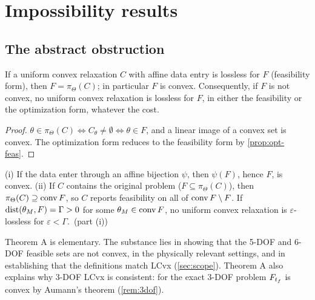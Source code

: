 \section{Impossibility results}\label{sec:impossibility}

\subsection{The abstract obstruction}

\begin{theorem}[Theorem A]\label{thm:A}
If a uniform convex relaxation $C$ with affine data entry is lossless for $F$ (feasibility form), then
$F=\pi_\Theta(C)$; in particular $F$ is convex. Consequently, if $F$ is not convex, no uniform convex relaxation is
lossless for $F$, in either the feasibility or the optimization form, whatever the cost.\Slean
\end{theorem}
\begin{proof}
$\theta\in\pi_\Theta(C)\iff C_\theta\neq\emptyset\iff\theta\in F$, and a linear image of a convex set is convex. The
optimization form reduces to the feasibility form by \cref{prop:opt-feas}.
\end{proof}

\begin{corollary}\label{cor:A}
(i) If the data enter through an affine bijection $\psi$, then $\psi(F)$, hence $F$, is convex.
(ii) If $C$ contains the original problem ($F\subseteq\pi_\Theta(C)$), then $\pi_\Theta(C)\supseteq\operatorname{conv} F$, so $C$
reports feasibility on all of $\operatorname{conv} F\setminus F$. If $\operatorname{dist}(\theta_M,F)=\Gamma>0$ for some $\theta_M\in\operatorname{conv} F$, no
uniform convex relaxation is $\varepsilon$-lossless for $\varepsilon<\Gamma$.\Slean\ (part (i))
\end{corollary}

Theorem A is elementary. The substance lies in showing that the 5-DOF and 6-DOF feasible sets are not convex, in the
physically relevant settings, and in establishing that the definitions match LCvx (\cref{sec:scope}). Theorem A also
explains why 3-DOF LCvx is consistent: for the exact 3-DOF problem $F_{t_f}$ is convex by Aumann's theorem
\cite{aumann1965} (\cref{rem:3dof}).

